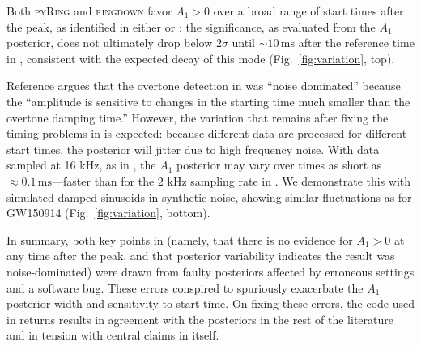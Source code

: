 \documentclass[aps,prd,twocolumn,superscriptaddress,preprintnumbers,floatfix,nofootinbib]{revtex4-2}
\begin{document}
Both \textsc{pyRing} and \textsc{ringdown} favor $A_1 > 0$ over a broad range of start times after the peak, as identified in either  \cite{Isi:2022mhy} or  \cite{Cotesta:2022pci}:
the significance, as evaluated from the $A_1$ posterior, does not ultimately drop below $2\sigma$ until {${\sim}10\,\mathrm{ms}$} after the reference time in \cite{Isi:2022mhy}, consistent with the expected decay of this mode (Fig.~\ref{fig:variation}, top).

Reference \cite{Cotesta:2022pci} argues that the overtone detection in \cite{Isi:2019aib} was ``noise dominated'' because the ``amplitude is sensitive to changes in the starting time much smaller than the overtone damping time.''
However, the variation that remains after fixing the timing problems in \cite{Cotesta:2022pci} is expected: because different data are processed for different start times, the posterior will jitter due to high frequency noise.
With data sampled at 16 kHz, as in \cite{Cotesta:2022pci}, the $A_1$ posterior may vary over times as short as $\approx 0.1\, \mathrm{ms}$---faster than for the 2 kHz sampling rate in \cite{Isi:2019aib,Isi:2022mhy}.
We demonstrate this with simulated damped sinusoids in synthetic noise, showing similar fluctuations as for GW150914 (Fig.~\ref{fig:variation}, bottom).


In summary, both key points in \cite{Cotesta:2022pci} (namely, that there is no evidence for $A_1 > 0$ at any time after the peak, and that posterior variability indicates the result was noise-dominated) were drawn from faulty posteriors affected by erroneous settings and a software bug.
These errors conspired to spuriously exacerbate the $A_1$ posterior width and sensitivity to start time.
On fixing these errors, the code used in \cite{Cotesta:2022pci} returns results in agreement with the posteriors in the rest of the literature and in tension with central claims in \cite{Cotesta:2022pci} itself.


\end{document}
